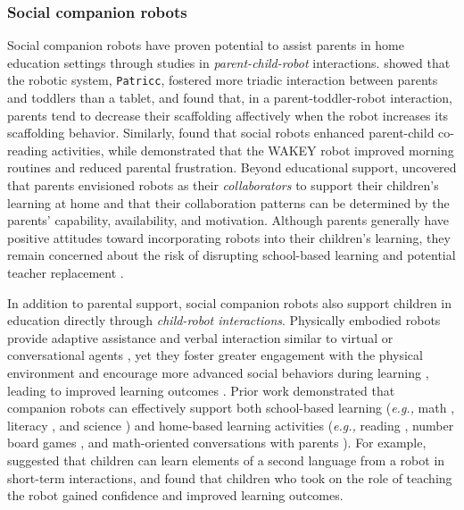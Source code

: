 \subsubsection{Social companion robots}
Social companion robots have proven potential to assist parents in home education settings through studies in \textit{parent-child-robot} interactions. \citet{gvirsman2020patricc} showed that the robotic system, \texttt{Patricc}, fostered more triadic interaction between parents and toddlers than a tablet, and \citet{gvirsman2024effect} found that, in a parent-toddler-robot interaction, parents tend to decrease their scaffolding affectively when the robot increases its scaffolding behavior. Similarly, \citet{chen2022designing} found that social robots enhanced parent-child co-reading activities, while \citet{chan2017wakey} demonstrated that the WAKEY robot improved morning routines and reduced parental frustration. Beyond educational support, \citet{ho2024s} uncovered that parents envisioned robots as their \textit{collaborators} to support their children's learning at home and that their collaboration patterns can be determined by the parents' capability, availability, and motivation. Although parents generally have positive attitudes toward incorporating robots into their children's learning, they remain concerned about the risk of disrupting school-based learning and potential teacher replacement \cite{tolksdorf2020parents, lee2008elementary, louie2021desire}.

In addition to parental support, social companion robots also support children in education directly through \textit{child-robot interactions}. Physically embodied robots provide adaptive assistance and verbal interaction similar to virtual or conversational agents \cite{ramachandran2019personalized, leyzberg2014personalizing, schodde2017adaptive, brown2014positive}, yet they foster greater engagement with the physical environment and encourage more advanced social behaviors during learning \cite{belpaeme2018social}, leading to improved learning outcomes \cite{leyzberg2012physical}. Prior work demonstrated that companion robots can effectively support both school-based learning (\textit{e.g.,} math \cite{lopez2018robotic}, literacy \cite{kennedy2016social, gordon2016affective}, and science \cite{davison2020working}) and home-based learning activities (\textit{e.g.,} reading \cite{michaelis2018reading, michaelis2019supporting}, number board games \cite{ho2021robomath}, and math-oriented conversations with parents \cite{ho2023designing}). For example, \citet{kennedy2016social} suggested that children can learn elements of a second language from a robot in short-term interactions, and \citet{tanaka2009use} found that children who took on the role of teaching the robot gained confidence and improved learning outcomes.

